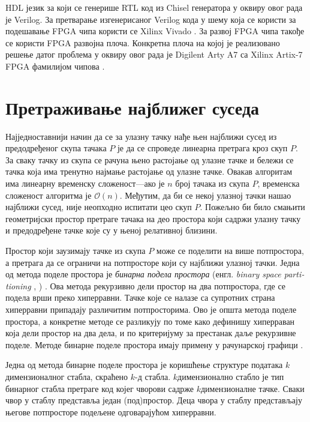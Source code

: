 \documentclass[master]{finthesis}
\makeatletter
\newcommand*{\engl}[2][\@empty]{%
    \edef\theacronym{#1}%
    (енгл. \foreignlanguage{english}{\emph{#2}%
    \ifx\theacronym\@empty \else , #1\fi})%
}
\newcommand*{\kdim}[1]{\texorpdfstring{$k$\Hyphdash}{k-}димензионал#1}
\newcommand*{\kd}{\texorpdfstring{$k$}{k}-д }
\makeatother
\begin{document}
HDL језик за који се генерише RTL код из Chisel генератора у оквиру овог  рада је Verilog. За претварање изгенерисаног Verilog кода у шему која се користи за подешавање FPGA чипа користи се Xilinx Vivado \cite{vivadosite}. За развој FPGA чипа такође се користи FPGA развојна плоча. Конкретна плоча на којој је реализовано решење датог проблема у оквиру овог  рада је Digilent Arty A7 \cite{arty7site} са Xilinx Artix-7 FPGA фамилијом чипова \cite{artix7site}.

\section{Претраживање најближег суседа}

Најједноставнији начин да се за улазну тачку нађе њен најближи сусед из предодређеног скупа тачака $P$ је да се спроведе линеарна претрага кроз скуп $P$. За сваку тачку из скупа се рачуна њено растојање од улазне тачке и бележи се тачка која има тренутно најмање растојање од улазне тачке. Овакав алгоритам има линеарну временску сложеност---ако је $n$ број тачака из скупа $P$, временска сложеност алгоритма је $\mathcal{O}(n)$. Међутим, да би се некој улазној тачки нашао најближи сусед, није неопходно испитати цео скуп $P$. Пожељно би било смањити геометријски простор претраге тачака на део простора који садржи улазну тачку и предодређене тачке које су у њеној релативној близини.

Простор који заузимају тачке из скупа $P$ може се поделити на више потпростора, а претрага да се ограничи на потпросторе који су најближи улазној тачки. Једна од метода поделе простора је \emph{бинарна подела простора} \engl{binary space partitioning}. Ова метода рекурзивно дели простор на два потпростора, где се подела врши преко хиперравни. Тачке које се налазе са супротних страна хиперравни припадају различитим потпросторима. Ово је општа метода поделе простора, а конкретне методе се разликују по томе како дефинишу хиперраван која дели простор на два дела, и по критеријуму за престанак даље рекурзивне поделе. Методе бинарне поделе простора имају примену у рачунарској графици \cite{fuchs1980visible}.

Једна од метода бинарне поделе простора је коришћење структуре података \kdim{ног} стабла, скраћено \kd стабла. \kdim{но} стабло је тип бинарног стабла претраге код којег чворови садрже \kdim{не} тачке. Сваки чвор у стаблу представља један (под)простор. Деца чвора у стаблу представљају његове потпросторе подељене одговарајућом хиперравни.
\end{document}
